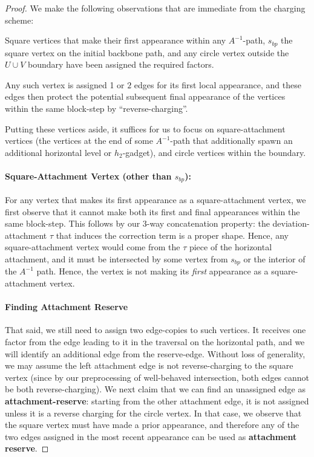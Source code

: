 \documentclass[12pt]{article}
\begin{document}
\begin{proof}  
We make the following observations that are immediate from the charging scheme:
\begin{displayquote}
	 Square vertices that make their first appearance within any $A^{-1}$-path, $s_{bp}$ the square vertex on the initial backbone path, and  any circle vertex outside the $U\cup V$ boundary have been assigned the required factors.
\end{displayquote}
Any such vertex is assigned 1 or $2$ edges for its first local appearance, and these edges then protect the potential subsequent final appearance of the vertices within the same block-step by ``reverse-charging''.

Putting these vertices aside, it suffices for us to focus on square-attachment vertices (the vertices at the end of some $A^{-1}$-path that additionally spawn an additional horizontal level or $h_2$-gadget), and circle vertices within the boundary.

\paragraph{Square-Attachment Vertex (other than $s_{bp}$):}
 For any vertex that makes its first appearance as a square-attachment vertex, we first observe that it cannot make both its first and final appearances within the same block-step. This follows by our $3$-way concatenation property: the deviation-attachment $\tau$ that induces the correction term is a proper shape. Hence, any square-attachment vertex would come from the $\tau$ piece of the horizontal attachment, and it must be intersected by some vertex from $s_{bp}$ or the interior of the $A^{-1}$ path. Hence, the vertex is not making its \emph{first} appearance as a square-attachment vertex.

\paragraph{Finding Attachment Reserve}
 That said, we still need to assign two edge-copies to such vertices. It receives one factor from the edge leading to it in the traversal on the horizontal path, and we will identify an additional edge from the reserve-edge.  Without loss of generality, we may assume the left attachment edge is not reverse-charging to the square vertex (since by our preprocessing of well-behaved intersection, both edges cannot be both reverse-charging). We next claim that we can find an unassigned edge as \textbf{attachment-reserve}: starting from the other attachment edge, it is not assigned unless it is a reverse charging for the circle vertex. In that case, we observe that the square vertex must have made a prior appearance, and therefore any of the two edges assigned in the most recent appearance can be used as \textbf{attachment reserve}.


\end{proof}
\end{document}
